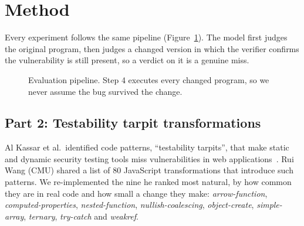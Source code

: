 \section{Method}
\label{sec:method}

Every experiment follows the same pipeline (Figure~\ref{fig:pipeline}). The model first judges the original
program, then judges a changed version in which the verifier confirms the vulnerability is still present, so a
\safe{} verdict on it is a genuine miss.

\begin{figure}[t]
\centering
{}
\caption{Evaluation pipeline. Step 4 executes every changed program, so we never assume the bug survived the change.}
\label{fig:pipeline}
\end{figure}


\subsection{Part 2: Testability tarpit transformations}
\label{sec:tarpits}
Al Kassar et al.\ identified code patterns, ``testability tarpits'', that make static and dynamic security testing
tools miss vulnerabilities in web applications~\cite{alkassar2022tarpits}. Rui Wang (CMU) shared a list of 80
JavaScript transformations that introduce such patterns. We re-implemented the nine he ranked most natural, by
how common they are in real code and how small a change they make: \emph{arrow-function},
\emph{computed-properties}, \emph{nested-function}, \emph{nullish-coalescing}, \emph{object-create},
\emph{simple-array}, \emph{ternary}, \emph{try-catch} and \emph{weakref}.

